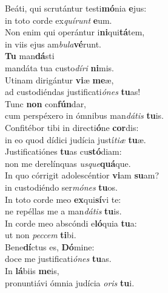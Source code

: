 \evenverse Beáti, qui scrutántur testi\textbf{mó}nia \textbf{e}jus:~\*\\
\evenverse in toto corde ex\textit{quí}\textit{runt} \textbf{e}um.\\
\oddverse Non enim qui operántur i\textbf{ni}qui\textbf{tá}tem,~\*\\
\oddverse in viis ejus am\textit{bu}\textit{la}\textbf{vé}runt.\\
\evenverse \textbf{Tu} man\textbf{dá}sti~\*\\
\evenverse mandáta tua custo\textit{dí}\textit{ri} \textbf{ni}mis.\\
\oddverse Utinam dirigántur \textbf{vi}æ \textbf{me}æ,~\*\\
\oddverse ad custodiéndas justificati\textit{ó}\textit{nes} \textbf{tu}as!\\
\evenverse Tunc \textbf{non} con\textbf{fún}dar,~\*\\
\evenverse cum perspéxero in ómnibus man\textit{dá}\textit{tis} \textbf{tu}is.\\
\oddverse Confitébor tibi in directi\textbf{ó}ne \textbf{cor}dis:~\*\\
\oddverse in eo quod dídici judícia justí\textit{ti}\textit{æ} \textbf{tu}æ.\\
\evenverse Justificatiónes \textbf{tu}as cu\textbf{stó}diam:~\*\\
\evenverse non me derelínquas \textit{us}\textit{que}\textbf{quá}que.\\
\oddverse In quo córrigit adolescéntior \textbf{vi}am \textbf{su}am?~\*\\
\oddverse in custodiéndo ser\textit{mó}\textit{nes} \textbf{tu}os.\\
\evenverse In toto corde meo \textbf{ex}qui\textbf{sí}vi te:~\*\\
\evenverse ne repéllas me a man\textit{dá}\textit{tis} \textbf{tu}is.\\
\oddverse In corde meo abscóndi e\textbf{ló}quia \textbf{tu}a:~\*\\
\oddverse ut non \textit{pec}\textit{cem} \textbf{ti}bi.\\
\evenverse Bene\textbf{dí}ctus es, \textbf{Dó}mine:~\*\\
\evenverse doce me justificati\textit{ó}\textit{nes} \textbf{tu}as.\\
\oddverse In \textbf{lá}biis \textbf{me}is,~\*\\
\oddverse pronuntiávi ómnia judícia \textit{o}\textit{ris} \textbf{tu}i.\\

